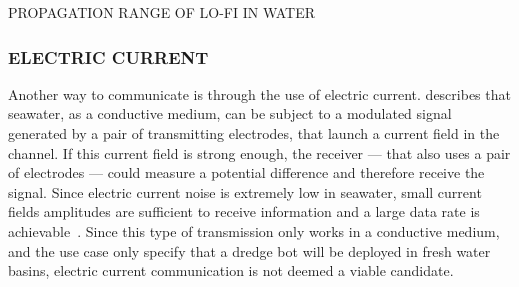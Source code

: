 \begin{RoyalFigure}[!htb, label=fig:propagationrange]{PROPAGATION RANGE OF LO-FI IN WATER}
\end{RoyalFigure}

\subsubsection{ELECTRIC CURRENT}\label{sec:ec}
 Another way to communicate is through the use of electric current. \citet{hagman_elias_design_2009} describes that seawater, as a conductive medium, can be subject to a modulated signal generated by a pair of transmitting electrodes, that launch a current field in the channel. If this current field is strong enough, the receiver --- that also uses a pair of electrodes --- could measure a potential difference and therefore receive the signal. Since electric current noise is extremely low in seawater, small current fields amplitudes are sufficient to receive information and a large data rate is achievable~\cite{hagman_elias_design_2009}.
 Since this type of transmission only works in a conductive medium, and the use case only specify that a dredge bot will be deployed in fresh water basins, electric current communication is not deemed a viable candidate.

